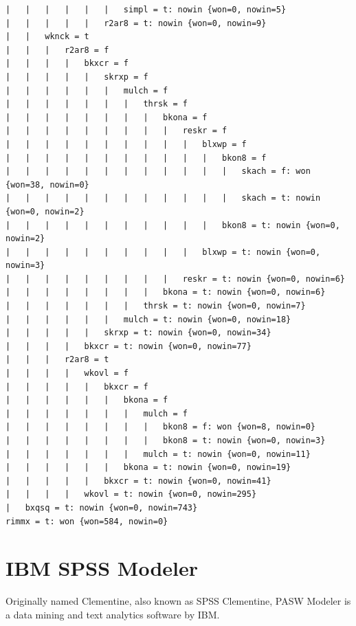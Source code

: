 \documentclass[11pt]{article}
\begin{document}
\begin{verbatim}
|   |   |   |   |   |   simpl = t: nowin {won=0, nowin=5}
|   |   |   |   |   r2ar8 = t: nowin {won=0, nowin=9}
|   |   wknck = t
|   |   |   r2ar8 = f
|   |   |   |   bkxcr = f
|   |   |   |   |   skrxp = f
|   |   |   |   |   |   mulch = f
|   |   |   |   |   |   |   thrsk = f
|   |   |   |   |   |   |   |   bkona = f
|   |   |   |   |   |   |   |   |   reskr = f
|   |   |   |   |   |   |   |   |   |   blxwp = f
|   |   |   |   |   |   |   |   |   |   |   bkon8 = f
|   |   |   |   |   |   |   |   |   |   |   |   skach = f: won {won=38, nowin=0}
|   |   |   |   |   |   |   |   |   |   |   |   skach = t: nowin {won=0, nowin=2}
|   |   |   |   |   |   |   |   |   |   |   bkon8 = t: nowin {won=0, nowin=2}
|   |   |   |   |   |   |   |   |   |   blxwp = t: nowin {won=0, nowin=3}
|   |   |   |   |   |   |   |   |   reskr = t: nowin {won=0, nowin=6}
|   |   |   |   |   |   |   |   bkona = t: nowin {won=0, nowin=6}
|   |   |   |   |   |   |   thrsk = t: nowin {won=0, nowin=7}
|   |   |   |   |   |   mulch = t: nowin {won=0, nowin=18}
|   |   |   |   |   skrxp = t: nowin {won=0, nowin=34}
|   |   |   |   bkxcr = t: nowin {won=0, nowin=77}
|   |   |   r2ar8 = t
|   |   |   |   wkovl = f
|   |   |   |   |   bkxcr = f
|   |   |   |   |   |   bkona = f
|   |   |   |   |   |   |   mulch = f
|   |   |   |   |   |   |   |   bkon8 = f: won {won=8, nowin=0}
|   |   |   |   |   |   |   |   bkon8 = t: nowin {won=0, nowin=3}
|   |   |   |   |   |   |   mulch = t: nowin {won=0, nowin=11}
|   |   |   |   |   |   bkona = t: nowin {won=0, nowin=19}
|   |   |   |   |   bkxcr = t: nowin {won=0, nowin=41}
|   |   |   |   wkovl = t: nowin {won=0, nowin=295}
|   bxqsq = t: nowin {won=0, nowin=743}
rimmx = t: won {won=584, nowin=0}
\end{verbatim}


\clearpage


\section{IBM SPSS Modeler}
Originally named Clementine, also known as SPSS Clementine, PASW Modeler is a
data mining and text analytics software by IBM.
\end{document}
